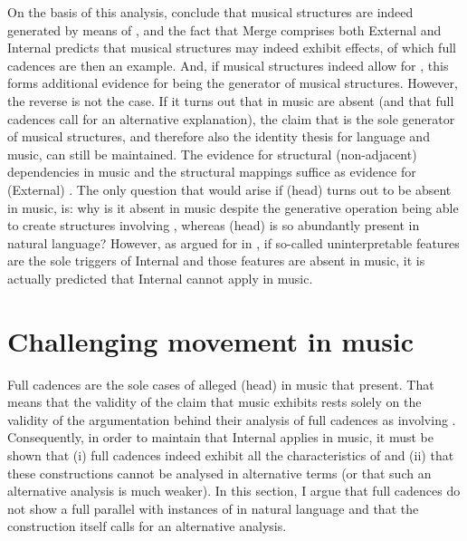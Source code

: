 \documentclass[output=paper]{langsci/langscibook}
\begin{document}
On the basis of this analysis, \citeauthor{KatzPes2011} conclude that musical
structures are indeed generated by means of , and the fact that
Merge comprises both External and Internal  predicts that musical
structures may indeed exhibit  effects, of which full cadences are then
an example.  And, if musical structures indeed allow for , this forms
additional evidence for  being the generator of musical structures.
However, the reverse is not the case. If it turns out that  in
music are absent (and that full cadences call for an alternative explanation),
the claim that  is the sole generator of musical structures, and therefore
also the identity thesis for language and music, can still be maintained. The
evidence for structural (non-adjacent) dependencies in music and the structural
mappings suffice as evidence for (External) . The only question that
would arise if (head)  turns out to be absent in music, is: why
is it absent in music despite the generative operation  being able
to create structures involving , whereas (head)  is
so abundantly present in natural language? However, as argued for in
, if so-called uninterpretable features are the
sole triggers of Internal  and those features are absent in music,
it is actually predicted that Internal  cannot apply in music.

\section{Challenging movement in music}\label{sec:key:26.4}

Full cadences are the sole cases of alleged (head)  in music that
\citeauthor{KatzPes2011} present. That means that the validity of the claim
that music exhibits  rests solely on the validity of the argumentation
behind their analysis of full cadences as involving .
Consequently, in order to maintain that Internal  applies in music,
it must be shown that (i) full cadences indeed exhibit all the characteristics
of  and (ii) that these constructions cannot be analysed in
alternative terms (or that such an alternative analysis is much weaker). In
this section, I argue that full cadences do not show a full parallel with
instances of  in natural language and that the construction itself
calls for an alternative analysis.
\end{document}
